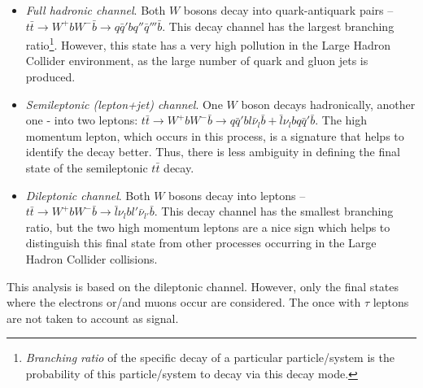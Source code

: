 \begin{itemize}
 \item \textit{Full hadronic channel}. Both $W$ bosons decay into quark-antiquark pairs -- $t\bar{t} \rightarrow W^{+}bW^{-}\bar{b} \rightarrow q\bar{q}'bq''\bar{q}'''\bar{b}$.
 This decay channel has the largest branching ratio\footnote{\textit{Branching ratio} of the specific decay of a particular particle/system is the probability of this particle/system
 to decay via this decay mode.}. However, this state has a very high pollution in the Large Hadron Collider environment, as the large number of quark and gluon jets is produced.
 
 \item \textit{Semileptonic (lepton+jet) channel}. One $W$ boson decays hadronically, another one - into two leptons:  $t\bar{t} \rightarrow W^{+}bW^{-}\bar{b} \rightarrow q\bar{q}'bl\bar{\nu}_{l}\bar{b}
 + \bar{l}\nu_{l}bq\bar{q}'\bar{b}$. The high momentum lepton, which occurs in this process, is a signature that helps to identify the decay better. Thus, there is less
 ambiguity in defining the final state of the semileptonic $t\bar{t}$ decay.
 
 \item \textit{Dileptonic channel}. Both $W$ bosons decay into leptons -- $t\bar{t} \rightarrow W^{+}bW^{-}\bar{b} \rightarrow \bar{l}\nu_{l}bl'\bar{\nu}_{l'}\bar{b}$.
 This decay channel has the smallest branching ratio, but the two high momentum leptons are a nice sign which helps to distinguish this final state from other processes
 occurring in the Large Hadron Collider collisions.
\end{itemize}

This analysis is based on the dileptonic channel. However, only the final states where the electrons or/and muons occur are considered. The once with $\tau$ leptons are 
not taken to account as signal.
